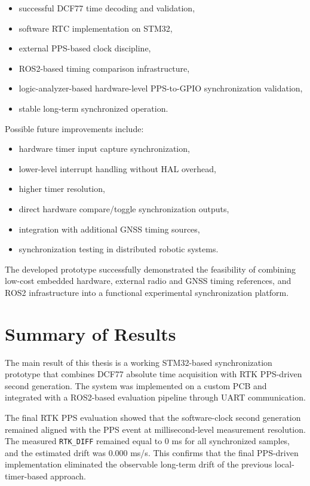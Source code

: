 \begin{itemize} 
\item successful DCF77 time decoding and validation, 
\item software RTC implementation on STM32, 
\item external PPS-based clock discipline, 
\item ROS2-based timing comparison infrastructure, 
\item logic-analyzer-based hardware-level PPS-to-GPIO synchronization validation,
\item stable long-term synchronized operation. 
\end{itemize}

\noindent Possible future improvements include:

\begin{itemize} \item hardware timer input capture synchronization, \item lower-level interrupt handling without HAL overhead, \item higher timer resolution, \item direct hardware compare/toggle synchronization outputs, \item integration with additional GNSS timing sources, \item synchronization testing in distributed robotic systems. \end{itemize}

The developed prototype successfully demonstrated the feasibility of combining low-cost embedded hardware, external radio and GNSS timing references, and ROS2 infrastructure into a functional experimental synchronization platform.

\section{Summary of Results}

The main result of this thesis is a working STM32-based synchronization prototype that combines DCF77 absolute time acquisition with RTK PPS-driven second generation. The system was implemented on a custom PCB and integrated with a ROS2-based evaluation pipeline through UART communication.

The final RTK PPS evaluation showed that the software-clock second generation remained aligned with the PPS event at millisecond-level measurement resolution. The measured \texttt{RTK\_DIFF} remained equal to 0 ms for all synchronized samples, and the estimated drift was 0.000 ms/s. This confirms that the final PPS-driven implementation eliminated the observable long-term drift of the previous local-timer-based approach.

